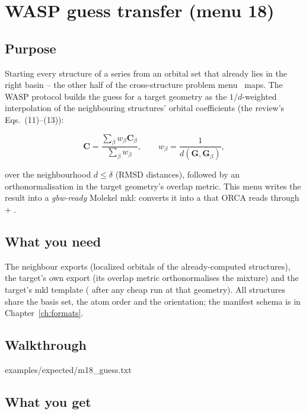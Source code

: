\chapter{WASP guess transfer (menu 18)}
\label{ch:menu18}

\section{Purpose}

Starting every structure of a series from an orbital set that already lies in
the right basin -- the other half of the cross-structure problem menu~
maps.  The WASP protocol builds the guess for a target geometry as the
$1/d$-weighted interpolation of the neighbouring structures' orbital
coefficients (the review's Eqs.~(11)--(13)):

\[
\mathbf{C} = \frac{\sum_\beta w_\beta \mathbf{C}_\beta}{\sum_\beta w_\beta},
\qquad w_\beta = \frac{1}{d(\mathbf{G}, \mathbf{G}_\beta)},
\]

over the neighbourhood $d \le \delta$ (RMSD distances), followed by an
orthonormalisation in the target geometry's overlap metric.  This menu writes
the result into a \emph{gbw-ready} Molekel mkl:  converts it into a  that ORCA reads through  +
.

\section{What you need}

The neighbour exports (localized orbitals of the already-computed structures),
the target's own export (its overlap metric orthonormalises the mixture) and
the target's mkl template ( after any cheap run
at that geometry).  All structures share the basis set, the atom order and the
orientation; the manifest schema is in Chapter~\ref{ch:formats}.

\section{Walkthrough}


  {examples/expected/m18_guess.txt}

\section{What you get}

